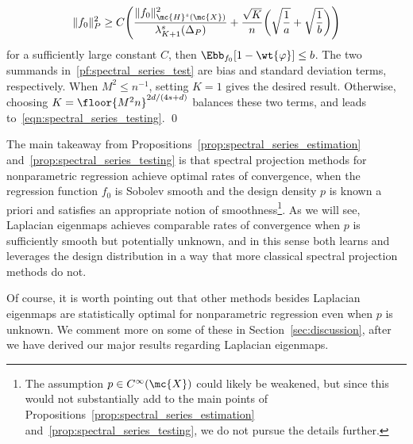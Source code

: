 \begin{equation}
\label{pf:spectral_series_test}
\|f_0\|_P^2 \geq C\Biggl(\frac{\|f_0\|_{\mc{H}^s(\mc{X})}^2}{\lambda_{K + 1}^s(\Delta_{P})} + \frac{\sqrt{K}}{n}\biggl(\sqrt{\frac{1}{a}} + \sqrt{\frac{1}{b}}\biggr)\Biggr)
\end{equation}
for a sufficiently large constant $C$, then $\Ebb_{f_0}[1 - \wt{\varphi}] \leq b$. The two summands in~\eqref{pf:spectral_series_test} are bias and standard deviation terms, respectively. When $M^2 \leq n^{-1}$, setting $K = 1$ gives the desired result. Otherwise, choosing $K = \floor{M^2n}^{2d/(4s + d)}$ balances these two terms, and leads to~\eqref{eqn:spectral_series_testing}. \qed

The main takeaway from Propositions~\ref{prop:spectral_series_estimation} and~\ref{prop:spectral_series_testing} is that spectral projection methods for nonparametric regression achieve optimal rates of convergence, when the regression function $f_0$ is Sobolev smooth and the design density $p$ is known a priori and satisfies an appropriate notion of smoothness\footnote{The assumption $p \in C^{\infty}(\mc{X})$ could likely be weakened, but since this would not substantially add to the main points of Propositions~\ref{prop:spectral_series_estimation} and~\ref{prop:spectral_series_testing}, we do not pursue the details further.}. As we will see, Laplacian eigenmaps achieves comparable rates of convergence when $p$ is sufficiently smooth but potentially unknown, and in this sense both learns and leverages the design distribution in a way that more classical spectral projection methods do not.

Of course, it is worth pointing out that other methods besides Laplacian eigenmaps are statistically optimal for nonparametric regression even when $p$ is unknown. We comment more on some of these in Section~\ref{sec:discussion}, after we have derived our major results regarding Laplacian eigenmaps.